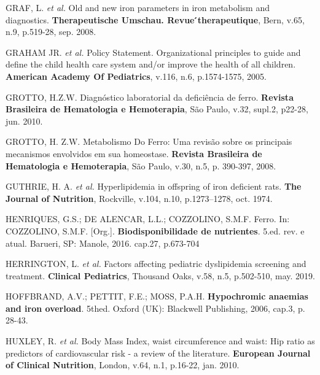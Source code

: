 \bigbreak

\noindent GRAF, L. \textit{et al.} Old and new iron parameters in iron metabolism and diagnostics. \textbf{Therapeutische Umschau. Revue ́therapeutique}, Bern, v.65, n.9, p.519-28, sep. 2008.

\bigbreak

\noindent GRAHAM JR. \textit{et al.} Policy Statement. Organizational principles to guide and define the child health care system and/or improve the health of all children. \textbf{American Academy Of Pediatrics}, v.116, n.6, p.1574-1575, 2005. 

\bigbreak

\noindent GROTTO, H.Z.W. Diagnóstico laboratorial da deficiência de ferro. \textbf{Revista Brasileira de Hematologia e Hemoterapia}, São Paulo, v.32, supl.2, p22-28, jun. 2010.

\bigbreak

\noindent GROTTO, H. Z.W. Metabolismo Do Ferro: Uma revisão sobre os principais mecanismos envolvidos em sua homeostase. \textbf{Revista Brasileira de Hematologia e Hemoterapia}, São Paulo, v.30, n.5, p. 390-397, 2008.

\bigbreak

\noindent GUTHRIE, H. A. \textit{et al.} Hyperlipidemia in offspring of iron deficient rats. \textbf{The Journal of Nutrition}, Rockville, v.104, n.10, p.1273–1278, oct. 1974.

\bigbreak

\noindent HENRIQUES, G.S.; DE ALENCAR, L.L.; COZZOLINO, S.M.F. Ferro. In: COZZOLINO, S.M.F. [Org.]. \textbf{Biodisponibilidade de nutrientes}. 5.ed. rev. e atual. Barueri, SP: Manole, 2016. cap.27, p.673-704

\bigbreak

\noindent HERRINGTON, L. \textit{et al.} Factors affecting pediatric dyslipidemia screening and treatment. \textbf{Clinical Pediatrics}, Thousand Oaks, v.58, n.5, p.502-510, may. 2019.

\bigbreak

\noindent HOFFBRAND, A.V.; PETTIT, F.E.; MOSS, P.A.H. \textbf{Hypochromic anaemias and iron overload}. 5thed. Oxford (UK): Blackwell Publishing, 2006, cap.3, p. 28-43. 

\bigbreak

\noindent HUXLEY, R. \textit{et al.} Body Mass Index, waist circumference and waist: Hip ratio as predictors of cardiovascular risk - a review of the literature. \textbf{European Journal of Clinical Nutrition}, London, v.64, n.1, p.16-22, jan. 2010.

